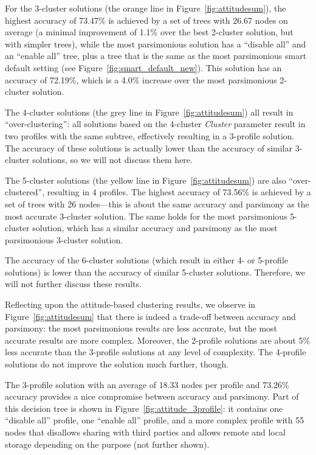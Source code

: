 For the 3-cluster solutions (the orange line in Figure~\ref{fig:attitudesum}), the highest accuracy of 73.47\% is achieved by a set of trees with 26.67 nodes on average (a minimal improvement of 1.1\% over the best 2-cluster solution, but with simpler trees), while the most parsimonious solution has a ``disable all'' and an ``enable all'' tree, plus a tree that is the same as the most parsimonious smart default setting (see Figure~\ref{fig:smart_default_new}). This solution has an accuracy of 72.19\%, which is a 4.0\% increase over the most parsimonious 2-cluster solution.

The 4-cluster solutions (the grey line in Figure~\ref{fig:attitudesum}) all result in ``over-clustering'': all solutions based on the 4-cluster \emph{Cluster} parameter result in two profiles with the same subtree, effectively resulting in a 3-profile solution. The accuracy of these solutions is actually lower than the accuracy of similar 3-cluster solutions, so we will not discuss them here.

The 5-cluster solutions (the yellow line in Figure~\ref{fig:attitudesum}) are also ``over-clustered'', resulting in 4 profiles. The highest accuracy of 73.56\% is achieved by a set of trees with 26 nodes---this is about the same accuracy and parsimony as the most accurate 3-cluster solution. The same holds for the most parsimonious 5-cluster solution, which has a similar accuracy and parsimony as the most parsimonious 3-cluster solution.

The accuracy of the 6-cluster solutions (which result in either 4- or 5-profile solutions) is lower than the accuracy of similar 5-cluster solutions. Therefore, we will not further discuss these results.

Reflecting upon the attitude-based clustering results, we observe in Figure~\ref{fig:attitudesum} that there is indeed a trade-off between accuracy and parsimony: the most parsimonious results are less accurate, but the most accurate results are more complex. Moreover, the 2-profile solutions are about 5\% less accurate than the 3-profile solutions at any level of complexity. The 4-profile solutions do not improve the solution much further, though.

The 3-profile solution with an average of 18.33 nodes per profile and 73.26\% accuracy provides a nice compromise between accuracy and parsimony. Part of this decision tree is shown in Figure~\ref{fig:attitude_3profile}: it contains one ``disable all'' profile, one ``enable all'' profile, and a more complex profile with 55 nodes that disallows sharing with third parties and allows remote and local storage depending on the purpose (not further shown).

